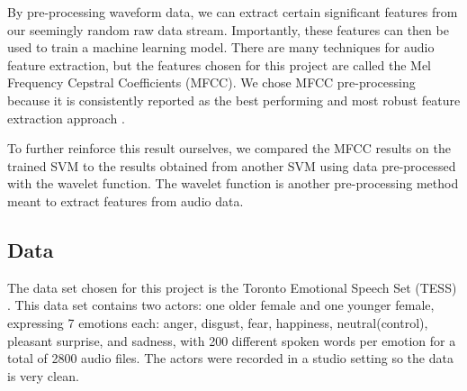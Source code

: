 \documentclass[12pt]{article}
\begin{document}
\begin{multicols*}{2}
By pre-processing waveform data, we can extract certain significant features from our seemingly random raw data stream. Importantly, these features can then be used to train a machine learning model. There are many techniques for audio feature extraction, but the features chosen for this project are called the Mel Frequency Cepstral Coefficients (MFCC). We chose MFCC pre-processing because it is consistently reported as the best performing and most robust feature extraction approach \cite{davis1980comparison, poonkuzhali2013approach, hegde2015feature}.

To further reinforce this result ourselves, we compared the MFCC results on the trained SVM to the results obtained from another SVM using data pre-processed with the wavelet function. The wavelet function is another pre-processing method meant to extract features from audio data.

\subsection*{Data}
The data set chosen for this project is the Toronto Emotional Speech Set (TESS) \cite{TESSdata}.
This data set contains two actors: one older female and one younger female, expressing 7 emotions each: anger, disgust, fear, happiness, neutral(control), pleasant surprise, and sadness, with 200 different spoken words per emotion for a total of 2800 audio files.
The actors were recorded in a studio setting so the data is very clean.


\end{multicols*}
\end{document}
